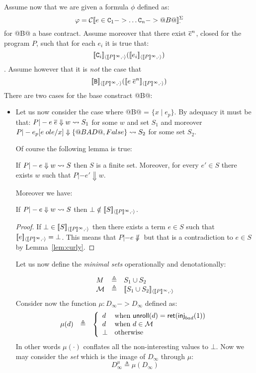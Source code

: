 \documentclass[preprint,nocopyrightspace,draft]{sigplanconf}
\begin{document}
Assume now that we are given a formula $\phi$ defined as: 
\[  \varphi = {\cal C}[\![e \in {\tt C}_1 -> \ldots {\tt C}_n -> @B@]\!]_{\cdot}^{\Sigma} \] 
for @B@ a base contract. Assume moreover that there exist $\overline{e}^{n}$, closed for the
program $P$, such that for each $e_i$ it is true that:
\[\interp{\Ct_i}{\dbrace{P}^\infty}{\cdot}(\interp{e_i}{\dbrace{P}^\infty}{\cdot})\]. 
Assume however that it is {\em not} the case that
\[\interp{{\tt B}}{\dbrace{P}^\infty}{\cdot}(\interp{e\;\oln{e}{n}}{\dbrace{P}^\infty}{\cdot})\]
There are two cases for the base constract @B@:
\begin{itemize}
  \item Let us now consider the case where @B@ = $\{ x \mid e_p \}$. By adequacy it must
  be that: $P |- e\;\overline{e} \Downarrow w \rightsquigarrow S_1$ for some $w$ and set $S_1$ and moreover
  $P |- e_p[e\;ol{e}/x] \Downarrow \{ @BAD@, False \} \rightsquigarrow S_2$ for some set $S_2$. 

  Of course the following lemma is true:
  \begin{lemma}\label{lem:curly} 
    If $P |- e \Downarrow w \rightsquigarrow S$ then $S$ is a finite set. Moreover, 
    for every $e' \in S$ there exists $w$ such that $P |- e' \Downarrow w$.
  \end{lemma}
  Moreover we have:
  \begin{lemma}\label{lem:bot-not-redex} 
     If $P |- e \Downarrow w \rightsquigarrow S$ then 
     $\bot \notin [\![S]\!]_{\langle {[\![P]\!]^{\infty}},{\cdot}\rangle}$. 
  \end{lemma}
  \begin{proof} If $\bot \in [\![S]\!]_{\langle {[\![P]\!]^{\infty}},{\cdot}\rangle}$ then there exists
  a term $e \in S$ such that $[\![e]\!]_{\langle {[\![P]\!]^{\infty}},{\cdot}\rangle} = \bot$. This means
  that $P |- e \not\Downarrow$ but that is a contradiction to $e \in S$ by 
  Lemma~\ref{lem:curly}.
  \end{proof}

  Let us now define the {\em minimal sets} operationally and denotationally:
  \newcommand{\Min}{\cal M}

  \[\begin{array}{lcl}
           M        & \triangleq & S_1 \cup S_2 \\
           {\cal M} & \triangleq & [\![S_1\cup S_2]\!]_{\langle {[\![P]\!]^{\infty}},{\cdot}\rangle}
  \end{array}\]
  Consider now the function $\mu : D_\infty -> D_\infty$ defined as: 
  \[\begin{array}{lcl} 
        \mu(d) & \triangleq & \left\{ \begin{array}{ll} 
                   d           & \text{when } \unroll(d) = \ret(\inj{bad}(1)) \\
                   d           & \text{when } d \in \Min \\ 
                   \bot        & \text{otherwise } 
                                      \end{array}\right.
  \end{array}\] 
  In other words $\mu(\cdot)$ conflates all the non-interesting values to $\bot$. 
  Now we may consider the {\em set} which is the image of $D_\infty$ through $\mu$: 
  \[ D_\infty^\mu  \triangleq \mu(D_\infty) \] 


\end{itemize}
\end{document}

